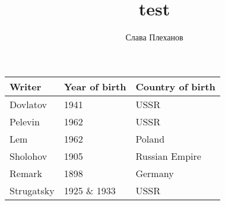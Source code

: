 \documentclass{article}
\title{test}
\author{Слава Плеханов}
\begin{document}
\begin{tabular}{ | l | l | l | }
\hline
Writer & Year of birth & Country of birth \\ \hline
Dovlatov & 1941 & USSR\\
Pelevin & 1962 & USSR\\
Lem & 1962 & Poland\\
Sholohov & 1905 & Russian Empire\\
Remark & 1898 & Germany\\
Strugatsky & 1925 \& 1933 & USSR\\

\hline
\end{tabular}
\end{document}
